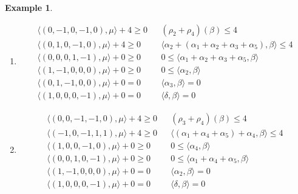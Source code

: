 \documentclass{amsart}
\newtheorem{example}[theorem]{Example}
\numberwithin{theorem}{section}
\begin{document}
\begin{example}
\begin{enumerate}
\begin{align*}
        \langle (1, 0, 0, -1, 0), \mu \rangle + 0 \geq 0 && 0 \leq \langle \alpha_4, \beta \rangle\\
        \langle (0, 1, -1, 0, 0), \mu \rangle + 0 \geq 0 && 0 \leq \langle \alpha_3, \beta \rangle\\
        \langle (0, 0, 1, 0, -1), \mu \rangle + 0 = 0 && \langle \alpha_1+\alpha_4+\alpha_5, \beta \rangle = 0\\
        \langle (1, 0, 0, 0, -1), \mu \rangle + 0 = 0 && \langle \delta, \beta \rangle = 0
      \end{align*}
    \item 
      \begin{align*}
        \langle (0, -1, 0,-1, 0), \mu \rangle + 4 \geq 0 && (\rho_2+\rho_4)(\beta) \leq 4\\
        \langle (0, 1, 0, -1, 0), \mu \rangle + 4 \geq 0 && \langle \alpha_2+(\alpha_1+\alpha_2+\alpha_3+\alpha_5), \beta \rangle \leq 4\\
        \langle (0, 0, 0, 1, -1), \mu \rangle + 0 \geq 0 && 0 \leq \langle \alpha_1+\alpha_2+\alpha_3+\alpha_5, \beta \rangle\\
        \langle (1, -1, 0, 0, 0), \mu \rangle + 0 \geq 0 && 0 \leq \langle \alpha_2, \beta \rangle\\
        \langle (0, 1, -1, 0, 0), \mu \rangle + 0 = 0 && \langle \alpha_3, \beta \rangle = 0\\
        \langle (1, 0, 0, 0, -1), \mu \rangle + 0 = 0 && \langle \delta, \beta \rangle = 0
      \end{align*}
    \item 
      \begin{align*}
        \langle (0, 0, -1,-1, 0), \mu \rangle + 4 \geq 0 && (\rho_3+\rho_4)(\beta) \leq 4\\
        \langle (-1, 0,-1, 1, 1), \mu \rangle + 4 \geq 0 && \langle (\alpha_1+\alpha_4+\alpha_5)+\alpha_4, \beta \rangle \leq 4\\
        \langle (1, 0, 0, -1, 0), \mu \rangle + 0 \geq 0 && 0 \leq \langle \alpha_4, \beta \rangle\\
        \langle (0, 0, 1, 0, -1), \mu \rangle + 0 \geq 0 && 0 \leq \langle \alpha_1+\alpha_4+\alpha_5, \beta \rangle\\
        \langle (1, -1, 0, 0, 0), \mu \rangle + 0 = 0 && \langle \alpha_2, \beta \rangle = 0\\
        \langle (1, 0, 0, 0, -1), \mu \rangle + 0 = 0 && \langle \delta, \beta \rangle = 0
      \end{align*}

\end{enumerate}
\end{example}
\end{document}
